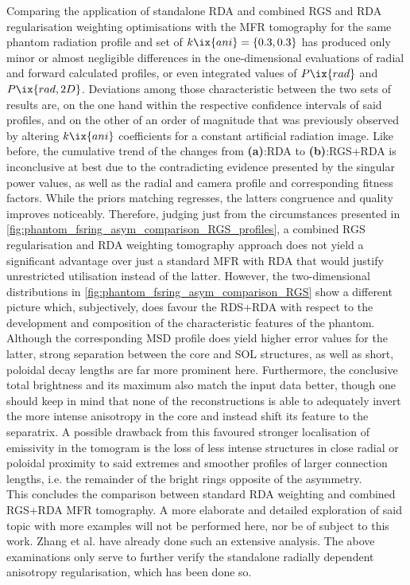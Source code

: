         Comparing the application of standalone RDA and combined RGS and RDA regularisation weighting optimisations with the MFR tomography for the same phantom radiation profile and set of $k\ix{ani}=\left\{0.3, 0.3\right\}$ has produced only minor or almost negligible differences in the one-dimensional evaluations of radial and forward calculated profiles, or even integrated values of $P\ix{rad}$ and $P\ix{rad,2D}$. Deviations among those characteristic between the two sets of results are, on the one hand within the respective confidence intervals of said profiles, and on the other of an order of magnitude that was previously observed by altering $k\ix{ani}$ coefficients for a constant artificial radiation image. Like before, the cumulative trend of the changes from \textbf{(a)}:RDA to \textbf{(b)}:RGS+RDA is inconclusive at best due to the contradicting evidence presented by the singular power values, as well as the radial and camera profile and corresponding fitness factors. While the priors matching regresses, the latters congruence and quality improves noticeably. Therefore, judging just from the circumstances presented in \cref{fig:phantom_fsring_asym_comparison_RGS_profiles}, a combined RGS regularisation and RDA weighting tomography approach does not yield a significant advantage over just a standard MFR with RDA that would justify unrestricted utilisation instead of the latter. However, the two-dimensional distributions in \cref{fig:phantom_fsring_asym_comparison_RGS} show a different picture which, subjectively, does favour the RDS+RDA with respect to the development and composition of the characteristic features of the phantom. Although the corresponding MSD profile does yield higher error values for the latter, strong separation between the core and SOL structures, as well as short, poloidal decay lengths are far more prominent here. Furthermore, the conclusive total brightness and its maximum also match the input data better, though one should keep in mind that none of the reconstructions is able to adequately invert the more intense anisotropy in the core and instead shift its feature to the separatrix. A possible drawback from this favoured stronger localisation of emissivity in the tomogram is the loss of less intense structures in close radial or poloidal proximity to said extremes and smoother profiles of larger connection lengths, i.e. the remainder of the bright rings opposite of the asymmetry.\\%
        This concludes the comparison between standard RDA weighting and combined RGS+RDA MFR tomography. A more elaborate and detailed exploration of said topic with more examples will not be performed here, nor be of subject to this work. Zhang et al.\cite{Zhang2013,Zhang2021_2} have already done such an extensive analysis. The above examinations only serve to further verify the standalone radially dependent anisotropy regularisation, which has been done so.\\%
%
